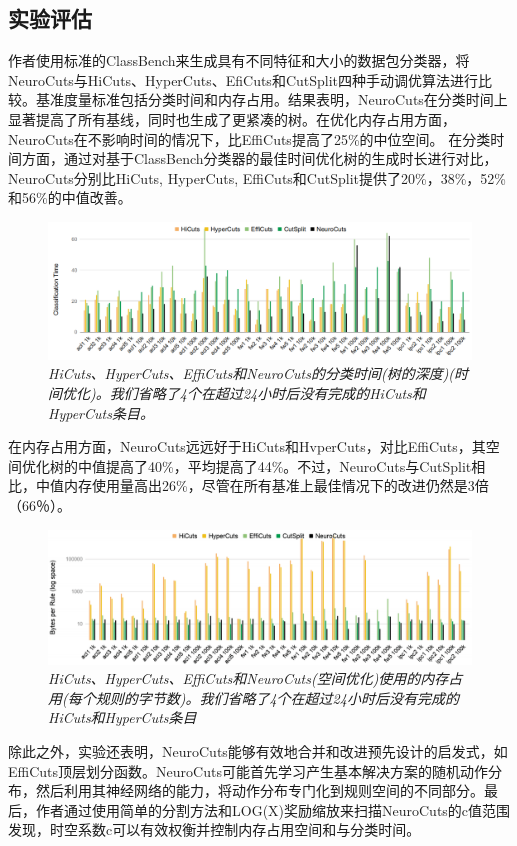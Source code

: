 \documentclass[UTF8,a4paper]{ctexart}
\begin{document}
\subsection{实验评估}
作者使用标准的ClassBench来生成具有不同特征和大小的数据包分类器，将NeuroCuts与HiCuts、HyperCuts、EfiCuts和CutSplit四种手动调优算法进行比较。基准度量标准包括分类时间和内存占用。结果表明，NeuroCuts在分类时间上显著提高了所有基线，同时也生成了更紧凑的树。在优化内存占用方面，NeuroCuts在不影响时间的情况下，比EffiCuts提高了25\%的中位空间。
在分类时间方面，通过对基于ClassBench分类器的最佳时间优化树的生成时长进行对比，NeuroCuts分别比HiCuts, HyperCuts, EffiCuts和CutSplit提供了20\%，38\%，52\%和56\%的中值改善。
\begin{figure}[H]
    \centering
    \includegraphics[width = \textwidth]{image011.png}
    \caption{\em HiCuts、HyperCuts、EffiCuts和NeuroCuts的分类时间(树的深度)(时间优化)。我们省略了4个在超过24小时后没有完成的HiCuts和HyperCuts条目。}
    \label{fig:004}
\end{figure}
在内存占用方面，NeuroCuts远远好于HiCuts和HvperCuts，对比EffiCuts，其空间优化树的中值提高了40\%，平均提高了44\%。不过，NeuroCuts与CutSplit相比，中值内存使用量高出26\%，尽管在所有基准上最佳情况下的改进仍然是3倍（66％）。
\begin{figure}[H]
    \centering
    \includegraphics[width = \textwidth]{image013.png}
    \caption{\em HiCuts、HyperCuts、EffiCuts和NeuroCuts(空间优化)使用的内存占用(每个规则的字节数)。我们省略了4个在超过24小时后没有完成的HiCuts和HyperCuts条目}
    \label{fig:005}
\end{figure}
除此之外，实验还表明，NeuroCuts能够有效地合并和改进预先设计的启发式，如EffiCuts顶层划分函数。NeuroCuts可能首先学习产生基本解决方案的随机动作分布，然后利用其神经网络的能力，将动作分布专门化到规则空间的不同部分。最后，作者通过使用简单的分割方法和LOG(X)奖励缩放来扫描NeuroCuts的c值范围发现，时空系数c可以有效权衡并控制内存占用空间和与分类时间。
\end{document}
